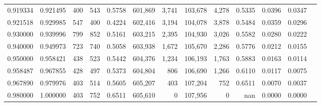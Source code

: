 \begin{tabular}{rrrrrrrrrrrrr}
0.919334 & 0.921495 &    400 &   543 &                                     0.5758 & 601,869 &   3,741 & 103,678 &   4,278 & 0.5335 & 0.0396 & 0.0347 \\
0.921518 & 0.929985 &    547 &   400 &                                     0.4224 & 602,416 &   3,194 & 104,078 &   3,878 & 0.5484 & 0.0359 & 0.0296 \\
0.930000 & 0.939996 &    799 &   852 &                                     0.5161 & 603,215 &   2,395 & 104,930 &   3,026 & 0.5582 & 0.0280 & 0.0222 \\
0.940000 & 0.949973 &    723 &   740 &                                     0.5058 & 603,938 &   1,672 & 105,670 &   2,286 & 0.5776 & 0.0212 & 0.0155 \\
0.950000 & 0.958421 &    438 &   523 &                                     0.5442 & 604,376 &   1,234 & 106,193 &   1,763 & 0.5883 & 0.0163 & 0.0114 \\
0.958487 & 0.967855 &    428 &   497 &                                     0.5373 & 604,804 &     806 & 106,690 &   1,266 & 0.6110 & 0.0117 & 0.0075 \\
0.967890 & 0.979976 &    403 &   514 &                                     0.5605 & 605,207 &     403 & 107,204 &     752 & 0.6511 & 0.0070 & 0.0037 \\
0.980000 & 1.000000 &    403 &   752 &                                     0.6511 & 605,610 &       0 & 107,956 &       0 &    nan & 0.0000 & 0.0000 \\
\bottomrule
\end{tabular}
